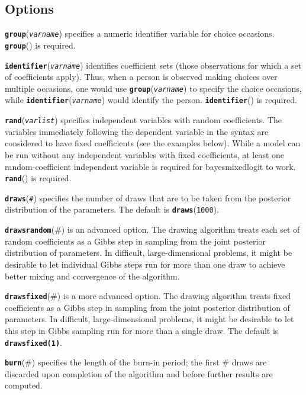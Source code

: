 \documentclass[11pt]{article}
\begin{document}
    \hypertarget{options}{%
\subsection{Options}\label{options}}

\textbf{\texttt{group}}(\emph{\texttt{varname}}) specifies a numeric
identifier variable for choice occasions. \textbf{\texttt{group}}() is
required.

\textbf{\texttt{identifier}}(\emph{\texttt{varname}}) identifies
coefficient sets (those observations for which a set of coefficients
apply). Thus, when a person is observed making choices over multiple
occasions, one would use
\textbf{\texttt{group}}(\emph{\texttt{varname}}) to specify the choice
occasions, while \textbf{\texttt{identifier}}(\emph{\texttt{varname}})
would identify the person. \textbf{\texttt{identifier}}() is required.

\textbf{\texttt{rand}}(\emph{\texttt{varlist}}) specifies independent
variables with random coefficients. The variables immediately following
the dependent variable in the syntax are considered to have fixed
coefficients (see the examples below). While a model can be run without
any independent variables with fixed coefficients, at least one
random-coefficient independent variable is required for bayesmixedlogit
to work. \textbf{\texttt{rand}}() is required.

\textbf{\texttt{draws}}(\texttt{\#}) specifies the number of draws that
are to be taken from the posterior distribution of the parameters. The
default is \textbf{\texttt{draws}}(\texttt{1000}).

\textbf{\texttt{drawsrandom}}(\#) is an advanced option. The drawing
algorithm treats each set of random coefficients as a Gibbs step in
sampling from the joint posterior distribution of parameters. In
difficult, large-dimensional problems, it might be desirable to let
individual Gibbs steps run for more than one draw to achieve better
mixing and convergence of the algorithm.

\textbf{\texttt{drawsfixed}}(\#) is a more advanced option. The drawing
algorithm treats fixed coefficients as a Gibbs step in sampling from the
joint posterior distribution of parameters. In difficult,
large-dimensional problems, it might be desirable to let this step in
Gibbs sampling run for more than a single draw. The default is
\textbf{\texttt{drawsfixed(1)}}.

\textbf{\texttt{burn}}(\#) specifies the length of the burn-in period;
the first \# draws are discarded upon completion of the algorithm and
before further results are computed.
\end{document}
